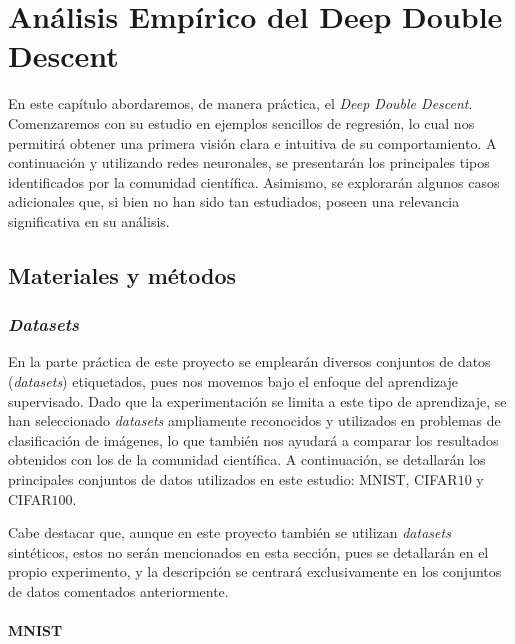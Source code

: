 
\chapter{Análisis Empírico del Deep Double Descent}\label{ch:analisis-empirico-ddd}

En este capítulo abordaremos, de manera práctica, el \textit{Deep Double Descent}. Comenzaremos con su estudio en ejemplos sencillos de regresión, lo cual nos permitirá obtener una primera visión clara e intuitiva de su comportamiento. A continuación y utilizando redes neuronales, se presentarán los principales tipos identificados por la comunidad científica. Asimismo, se explorarán algunos casos adicionales que, si bien no han sido tan estudiados, poseen una relevancia significativa en su análisis.

\section{Materiales y métodos}\label{sec:materiales-y-metodos}

\subsection{\textit{Datasets}}\label{subsec:datasets}

En la parte práctica de este proyecto se emplearán diversos conjuntos de datos (\textit{datasets}) etiquetados, pues nos movemos bajo el enfoque del aprendizaje supervisado. Dado que la experimentación se limita a este tipo de aprendizaje, se han seleccionado \textit{datasets} ampliamente reconocidos y utilizados en problemas de clasificación de imágenes, lo que también nos ayudará a comparar los resultados obtenidos con los de la comunidad científica. A continuación, se detallarán los principales conjuntos de datos utilizados en este estudio: MNIST, CIFAR$10$ y CIFAR$100$.

Cabe destacar que, aunque en este proyecto también se utilizan \textit{datasets} sintéticos, estos no serán mencionados en esta sección, pues se detallarán en el propio experimento, y la descripción se centrará exclusivamente en los conjuntos de datos comentados anteriormente.

\subsubsection{MNIST}\label{subsubsec:MNIST}

